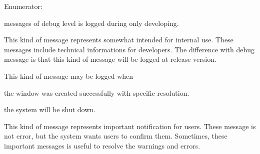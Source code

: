 \begin{Desc}
\item[Enumerator\-: ]\par
\begin{description}
\item[{\em 
\hypertarget{classhryky_1_1log_1_1_level_a9e6bba8f272859b212f49e4478a863d7a9e66c9bec86b804ca7b483d470b3d1fc}{debug\-\_\-}\label{classhryky_1_1log_1_1_level_a9e6bba8f272859b212f49e4478a863d7a9e66c9bec86b804ca7b483d470b3d1fc}
}]messages of debug level is logged during only developing. \item[{\em 
\hypertarget{classhryky_1_1log_1_1_level_a9e6bba8f272859b212f49e4478a863d7af1fa5c4581c2c7715e12d2717adc5705}{info\-\_\-}\label{classhryky_1_1log_1_1_level_a9e6bba8f272859b212f49e4478a863d7af1fa5c4581c2c7715e12d2717adc5705}
}]This kind of message represents somewhat intended for internal use. These messages include technical informations for developers. The difference with debug message is that this kind of message will be logged at release version.

This kind of message may be logged when
\begin{DoxyItemize}
\item the window was created successfully with specific resolution.
\item the system will be shut down. 
\end{DoxyItemize}\item[{\em 
\hypertarget{classhryky_1_1log_1_1_level_a9e6bba8f272859b212f49e4478a863d7a89fea8b8aac2d57814d50d86678baead}{notice\-\_\-}\label{classhryky_1_1log_1_1_level_a9e6bba8f272859b212f49e4478a863d7a89fea8b8aac2d57814d50d86678baead}
}]This kind of message represents important notification for users. These message is not error, but the system wants users to confirm them. Sometimes, these important messages is useful to resolve the warnings and errors.


\end{description}
\end{Desc}
